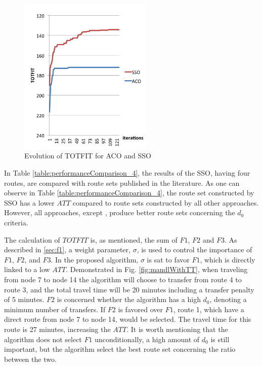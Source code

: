  \begin{figure}[H]
    \begin{center}
    \includegraphics[width=2.5in]{assets/acovsssoNEW.png}
    \end{center}
    \caption{Evolution of TOTFIT for ACO and SSO }
    \label{fig:acovssso} 
\end{figure}
In Table \vref{table:performanceComparison_4}, the results of the SSO, having four routes, are compared with route sets published in the literature. As one can observe in Table \vref{table:performanceComparison_4}, the route set constructed by SSO has a lower $ATT$ compared to route sets constructed by all other approaches. However, all approaches, except \citep{mandl79, kidwai98, chakroborty02}, produce better route sets concerning the $d_0$ criteria. 

The calculation of $TOTFIT$ is, as mentioned, the sum of $F1$, $F2$ and $F3$. As described in \vref{sec:f1}, a weight parameter, $\sigma$, is used to control the importance of $F1$, $F2$, and $F3$. In the proposed algorithm, $\sigma$ is sat to favor $F1$, which is directly linked to a low $ATT$. Demonstrated in Fig. \vref{fig:mandlWithTT}, when traveling from node 7 to node 14 the algorithm will choose to transfer from route 4 to route 3, and the total travel time will be 20 minutes including a transfer penalty of 5 minutes. $F2$ is concerned whether the algorithm has a high $d_0$, denoting a minimum number of transfers. If $F2$ is favored over $F1$, route 1, which have a direct route from node 7 to node 14, would be selected. The travel time for this route is 27 minutes, increasing the $ATT$. It is worth mentioning that the algorithm does not select $F1$ unconditionally, a high amount of $d_0$ is still important, but the algorithm select the best route set concerning the ratio between the two. 

